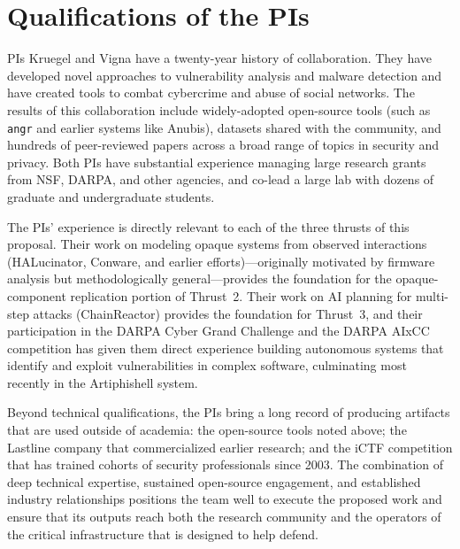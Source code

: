\section{Qualifications of the PIs}
\label{sec:pis}

PIs Kruegel and Vigna have a twenty-year history of collaboration.
They have developed novel approaches to vulnerability analysis and
malware detection and have created tools to combat cybercrime and
abuse of social networks. The results of this collaboration include
widely-adopted open-source tools (such as \texttt{angr} and earlier
systems like Anubis), datasets shared with the community, and
hundreds of peer-reviewed papers across a broad range of topics in
security and privacy. Both PIs have substantial experience managing
large research grants from NSF, DARPA, and other agencies, and
co-lead a large lab with dozens of graduate and undergraduate students.

The PIs' experience is directly relevant to each of the three thrusts
of this proposal. Their work on modeling opaque systems from observed
interactions (HALucinator, Conware, and earlier efforts)---originally
motivated by firmware analysis but methodologically general---provides
the foundation for the opaque-component replication portion of
Thrust~2. Their work on AI planning for multi-step attacks
(ChainReactor) provides the foundation for Thrust~3, and their
participation in the DARPA Cyber Grand Challenge and the DARPA AIxCC
competition has given them direct experience building autonomous
systems that identify and exploit vulnerabilities in complex software,
culminating most recently in the Artiphishell system.

Beyond technical qualifications, the PIs bring a long record of
producing artifacts that are used outside of academia: the open-source
tools noted above; the Lastline company that commercialized earlier
research; and the iCTF competition that has trained cohorts of
security professionals since 2003. The combination of deep technical
expertise, sustained open-source engagement, and established industry
relationships positions the team well to execute the proposed work
and ensure that its outputs reach both the research community and the
operators of the critical infrastructure that \sysname is designed to
help defend.
